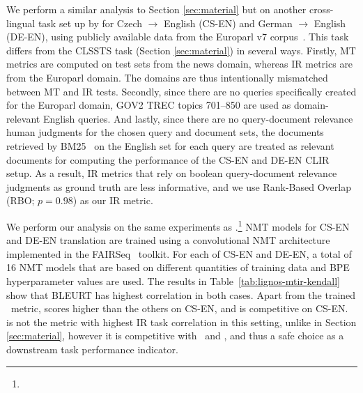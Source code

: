 We perform a similar analysis to Section \ref{sec:material} but on another cross-lingual task set up by \citet{lignos-etal-2019-MT-IR} for Czech $\rightarrow$ English (CS-EN) and German $\rightarrow$ English (DE-EN), using publicly available data from the Europarl v7 corpus~\cite{koehn2005europarl}. 
This task differs from the CLSSTS task (Section \ref{sec:material}) in several ways.
Firstly, MT metrics are computed on test sets from the news domain, whereas IR metrics are from the Europarl domain. The domains are thus intentionally mismatched between MT and IR tests.
Secondly, since there are no queries specifically created for the Europarl domain, GOV2 TREC topics 701–850 are used as domain-relevant English queries.
And lastly, since there are no query-document relevance human judgments for the chosen query and document sets, the documents retrieved by BM25~\cite{jones2000probabilistic} on the English set for each query are treated as relevant documents for computing the performance of the CS-EN and DE-EN CLIR setup. 
As a result, IR metrics that rely on boolean query-document relevance judgments as ground truth are less informative, and we use Rank-Based Overlap (RBO; $p=0.98$) \cite{webber2010RBO} as our IR metric.

We perform our analysis on the same experiments as \citet{lignos-etal-2019-MT-IR}.\footnote{}
NMT models for CS-EN and DE-EN translation are trained using a convolutional NMT architecture \cite{gehring2017cnn} implemented in the FAIRSeq~\cite{ott2019fairseq} toolkit.
For each of CS-EN and DE-EN, a total of 16 NMT models that are based on different quantities of training data and BPE hyperparameter values are used.
The results in Table~\ref{tab:lignos-mtir-kendall} show that BLEURT has highest correlation in both cases.
Apart from the trained \blrtmd\ metric,  scores higher than the others on CS-EN, and is competitive on CS-EN.  is not the metric with highest IR task correlation in this setting, unlike in Section \ref{sec:material}, however it is competitive with \bleu\ and , and thus a safe choice as a downstream task performance indicator. 

